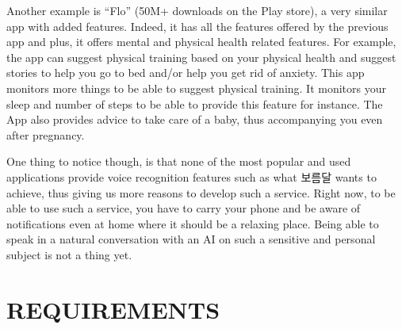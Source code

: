 \documentclass[conference]{IEEEtran}
\begin{document}
Another example is “Flo” (50M+ downloads on the Play store), a very similar app with added features. Indeed, it has all the features offered by the previous app and plus, it offers mental and physical health related features. For example, the app can suggest physical training based on your physical health and suggest stories to help you go to bed and/or help you get rid of anxiety. This app monitors more things to be able to suggest physical training. It monitors your sleep and number of steps to be able to provide this feature for instance. The App also provides advice to take care of a baby, thus accompanying you even after pregnancy.

One thing to notice though, is that none of the most popular and used applications provide voice recognition features such as what 보름달 wants to achieve, thus giving us more reasons to develop such a service. Right now, to be able to use such a service, you have to carry your phone and be aware of notifications even at home where it should be a  relaxing place. Being able to speak in a natural conversation with an AI on such a sensitive and personal subject is not a thing yet.

\section{REQUIREMENTS}
\end{document}
